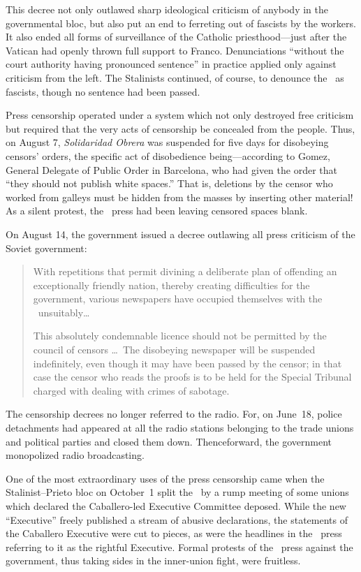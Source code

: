 This decree not only outlawed sharp ideological criticism of anybody in the governmental bloc, but also put an end to ferreting out of fascists by the workers. It also ended all forms of surveillance of the Catholic priesthood---just after the Vatican had openly thrown full support to Franco. Denunciations ``without the court authority having pronounced sentence'' in practice applied only against criticism from the left. The Stalinists continued, of course, to denounce the \POUM\ as fascists, though no sentence had been passed.

Press censorship operated under a system which not only destroyed free criticism but required that the very acts of censorship be concealed from the people. Thus, on August 7, \emph{Solidaridad Obrera} was suspended for five days for disobeying censors’ orders, the specific act of disobedience being---according to Gomez, General Delegate of Public Order in Barcelona, who had given the order that ``they should not publish white spaces.'' That is, deletions by the censor who worked from galleys must be hidden from the masses by inserting other material! As a silent protest, the \CNT\ press had been leaving censored spaces blank.

On August 14, the government issued a decree outlawing all press criticism of the Soviet government:

\begin{quotation}
  With repetitions that permit divining a deliberate plan of offending an exceptionally friendly nation, thereby creating difficulties for the government, various newspapers have occupied themselves with the \USSR\ unsuitably\dots
  
  This absolutely condemnable licence should not be permitted by the council of censors \dots\ The disobeying newspaper will be suspended indefinitely, even though it may have been passed by the censor; in that case the censor who reads the proofs is to be held for the Special Tribunal charged with dealing with crimes of sabotage.
\end{quotation}

The censorship decrees no longer referred to the radio. For, on June~18, police detachments had appeared at all the radio stations belonging to the trade unions and political parties and closed them down. Thenceforward, the government monopolized radio broadcasting.

One of the most extraordinary uses of the press censorship came when the Stalinist--Prieto bloc on October~1 split the \UGT\ by a rump meeting of some unions which declared the Caballero-led Executive Committee deposed. While the new ``Executive'' freely published a stream of abusive declarations, the statements of the Caballero Executive were cut to pieces, as were the headlines in the \CNT\ press referring to it as the rightful Executive. Formal protests of the \CNT\ press against the government, thus taking sides in the inner-union fight, were fruitless.

